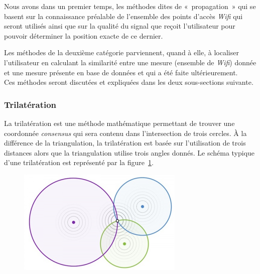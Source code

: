 \documentclass[10pt,journal,compsoc]{IEEEtran}
\begin{document}
    Nous avons dans un premier temps, les méthodes dites de «~propagation~» qui se basent sur la connaissance préalable de l'ensemble des points d'accès
	\textit{Wifi} qui seront utilisés ainsi que sur la qualité du signal que reçoit l'utilisateur pour pouvoir déterminer la position exacte de ce dernier.

    Les méthodes de la deuxième catégorie parviennent, quand à elle, à localiser l'utilisateur en calculant la similarité entre une mesure (ensemble de
	\textit{Wifi}) donnée et une mesure présente en base de données et qui a été faite ultérieurement.\\  %
    Ces méthodes seront discutées et expliquées dans les deux sous-sections suivante.

    \subsubsection{Trilatération}
      La trilatération est une méthode mathématique permettant de trouver une coordonnée \textit{consensus} qui sera contenu dans l'intersection de trois
	  cercles. À la différence de la triangulation, la trilatération est basée sur l'utilisation de trois distances alors que la triangulation utilise
	  trois angles donnés. Le schéma typique d'une trilatération est représenté par la figure~\ref{fig:trilatération}.

	  \begin{figure}
	  	\label{fig:trilatération}
        \includegraphics[scale=0.8]{images/trilateration.png}
      \end{figure}
\end{document}
